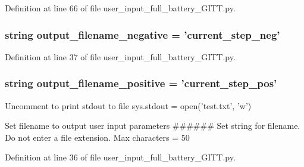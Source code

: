 Definition at line 66 of file user\-\_\-input\-\_\-full\-\_\-battery\-\_\-\-G\-I\-T\-T.\-py.

\hypertarget{namespaceuser__input__full__battery___g_i_t_t_a701d8142cb069e7737cab8445986caa3}{
\subsubsection[{output\-\_\-filename\-\_\-negative}]{\setlength{\rightskip}{0pt plus 5cm}string output\-\_\-filename\-\_\-negative = 'current\-\_\-step\-\_\-neg'}}\label{namespaceuser__input__full__battery___g_i_t_t_a701d8142cb069e7737cab8445986caa3}


Definition at line 37 of file user\-\_\-input\-\_\-full\-\_\-battery\-\_\-\-G\-I\-T\-T.\-py.

\hypertarget{namespaceuser__input__full__battery___g_i_t_t_aa07a082ed078c3321f15b79529277837}{
\subsubsection[{output\-\_\-filename\-\_\-positive}]{\setlength{\rightskip}{0pt plus 5cm}string output\-\_\-filename\-\_\-positive = 'current\-\_\-step\-\_\-pos'}}\label{namespaceuser__input__full__battery___g_i_t_t_aa07a082ed078c3321f15b79529277837}


Uncomment to print stdout to file sys.\-stdout = open('test.\-txt', 'w') 

Set filename to output user input parameters \#\#\#\#\#\# Set string for filename. Do not enter a file extension. Max characters = 50 

Definition at line 36 of file user\-\_\-input\-\_\-full\-\_\-battery\-\_\-\-G\-I\-T\-T.\-py.

